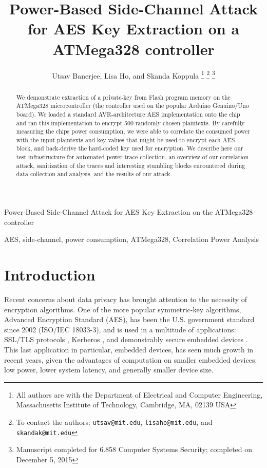 \documentclass[journal]{ieee_style}
\begin{document}
\title{Power-Based Side-Channel Attack for AES Key Extraction on a ATMega328 controller}

\author{Utsav Banerjee,
        Lisa Ho,
        and Skanda Koppula%
\thanks{All authors are with the Department
of Electrical and Computer Engineering, Massachusetts Institute of Technology, Cambridge,
MA, 02139 USA}%
\thanks{To contact the authors: \texttt{utsav@mit.edu}, \texttt{lisaho@mit.edu}, and \texttt{skandak@mit.edu}}%
\thanks{Manuscript completed for 6.858 Computer Systems Security; completed on December 5, 2015}}

%
{Power-Based Side-Channel Attack for AES Key Extraction on the ATMega328 controller}
\maketitle

\begin{abstract}
    We demonstrate extraction of a private-key from Flash program memory on the ATMega328 microcontroller (the controller used on the popular Arduino Genuino/Uno board). We loaded a standard AVR-architecture AES implementation onto the chip and ran this implementation to encrypt 500 randomly chosen plaintexts. By carefully measuring the chips power consumption, we were able to correlate the consumed power with the input plaintexts and key values that might be used to encrypt each AES block, and back-derive the hard-coded key used for encryption. We describe here our test infrastructure for automated power trace collection, an overview of our correlation attack, sanitization of the traces and interesting stumbling blocks encountered during data collection and analysis, and the results of our attack.
\end{abstract}

\begin{IEEEkeywords}
AES, side-channel, power consumption, ATMega328, Correlation Power Analysis
\end{IEEEkeywords}

\section{Introduction}
Recent concerns about data privacy has brought attention to the necessity of encryption algorithms. One of the more popular symmetric-key algorithms, Advanced Encryption Standard (AES), has been the U.S. government standard since 2002 (ISO/IEC 18033-3), and is used in a multitude of applications: SSL/TLS protocols \cite{ssl}, Kerberos \cite{kerberos}, and demonstrably secure embedded devices \cite{embedded}. This last application in particular, embedded devices, has seen much growth in recent years, given the advantages of computation on smaller embedded devices: low power, lower system latency, and generally smaller device size.
\end{document}
